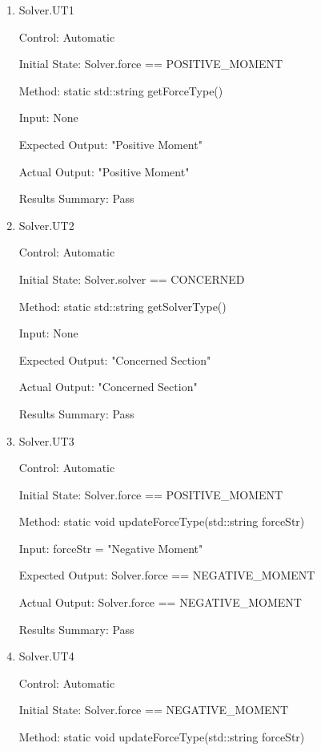 \documentclass[12pt, titlepage]{article}
\begin{document}
\begin{enumerate}

    \item{Solver.UT1\\}
    
    Control: Automatic

    Initial State: Solver.force == POSITIVE\_MOMENT
    
    Method: static std::string getForceType()
    
    Input: None
    
    Expected Output: "Positive Moment"

    Actual Output: "Positive Moment"

    Results Summary: Pass

    \item{Solver.UT2\\}
    
    Control: Automatic

    Initial State: Solver.solver == CONCERNED
    
    Method: static std::string getSolverType()
    
    Input: None
    
    Expected Output: "Concerned Section"

    Actual Output: "Concerned Section"

    Results Summary: Pass

    \item{Solver.UT3\\}
    
    Control: Automatic

    Initial State: Solver.force == POSITIVE\_MOMENT
    
    Method: static void updateForceType(std::string forceStr)
    
    Input: forceStr = "Negative Moment"
    
    Expected Output: Solver.force ==  NEGATIVE\_MOMENT

    Actual Output: Solver.force == NEGATIVE\_MOMENT

    Results Summary: Pass

    \item{Solver.UT4\\}
    
    Control: Automatic

    Initial State: Solver.force == NEGATIVE\_MOMENT
    
    Method: static void updateForceType(std::string forceStr)
    

\end{enumerate}
\end{document}
